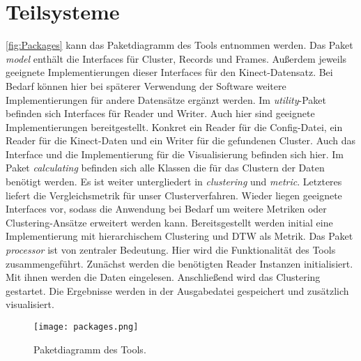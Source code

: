 \section{Teilsysteme}
\label{4-Teilsysteme}
\autoref{fig:Packages} kann das Paketdiagramm des Tools entnommen werden.
Das Paket \emph{model} enthält die Interfaces für Cluster, Records und Frames.
Außerdem jeweils geeignete Implementierungen dieser Interfaces für den Kinect-Datensatz.
Bei Bedarf können hier bei späterer Verwendung der Software weitere Implementierungen
für andere Datensätze ergänzt werden.
Im \emph{utility}-Paket befinden sich Interfaces für Reader und Writer.
Auch hier sind geeignete Implementierungen bereitgestellt.
Konkret ein Reader für die Config-Datei, ein Reader für die Kinect-Daten
und ein Writer für die gefundenen Cluster.
Auch das Interface und die Implementierung für die Visualisierung befinden sich hier.
Im Paket \emph{calculating} befinden sich alle Klassen die für das Clustern der Daten benötigt werden.
Es ist weiter untergliedert in \emph{clustering} und \emph{metric}.
Letzteres liefert die Vergleichsmetrik für unser Clusterverfahren.
Wieder liegen geeignete Interfaces vor,
sodass die Anwendung bei Bedarf um weitere Metriken oder Clustering-Ansätze erweitert werden kann.
Bereitsgestellt werden initial eine Implementierung mit hierarchischem Clustering
und \ac{DTW} als Metrik.
Das Paket \emph{processor} ist von zentraler Bedeutung.
Hier wird die Funktionalität des Tools zusammengeführt.
Zunächst werden die benötigten Reader Instanzen initialisiert.
Mit ihnen werden die Daten eingelesen.
Anschließend wird das Clustering gestartet.
Die Ergebnisse werden in der Ausgabedatei gespeichert und zusätzlich visualisiert.
\begin{figure}[ht]
    \begin{center}
    \texttt{[image: packages.png]}
    \end{center}
    \caption{Paketdiagramm des Tools.}
    \label{fig:Packages}
\end{figure}

\clearpage
